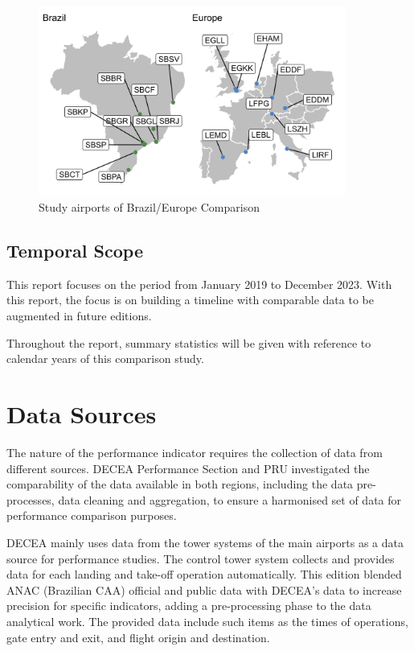 \documentclass[
  a4paper,
  DIV=11,
  numbers=noendperiod]{scrreport}
\begin{document}
\begin{figure}[H]

{\centering \includegraphics[width=0.9\textwidth,height=\textheight]{././figures/scope-airports.png}

}

\caption{\label{fig-scope-airports}Study airports of Brazil/Europe
Comparison}

\end{figure}

\hypertarget{temporal-scope}{%
\subsection{Temporal Scope}\label{temporal-scope}}

This report focuses on the period from January 2019 to December 2023.
With this report, the focus is on building a timeline with comparable
data to be augmented in future editions.

Throughout the report, summary statistics will be given with reference
to calendar years of this comparison study.

\hypertarget{data-sources}{%
\section{Data Sources}\label{data-sources}}

The nature of the performance indicator requires the collection of data
from different sources. DECEA Performance Section and PRU investigated
the comparability of the data available in both regions, including the
data pre-processes, data cleaning and aggregation, to ensure a
harmonised set of data for performance comparison purposes.

DECEA mainly uses data from the tower systems of the main airports as a
data source for performance studies. The control tower system collects
and provides data for each landing and take-off operation automatically.
This edition blended ANAC (Brazilian CAA) official and public data with
DECEA's data to increase precision for specific indicators, adding a
pre-processing phase to the data analytical work. The provided data
include such items as the times of operations, gate entry and exit, and
flight origin and destination.
\end{document}
